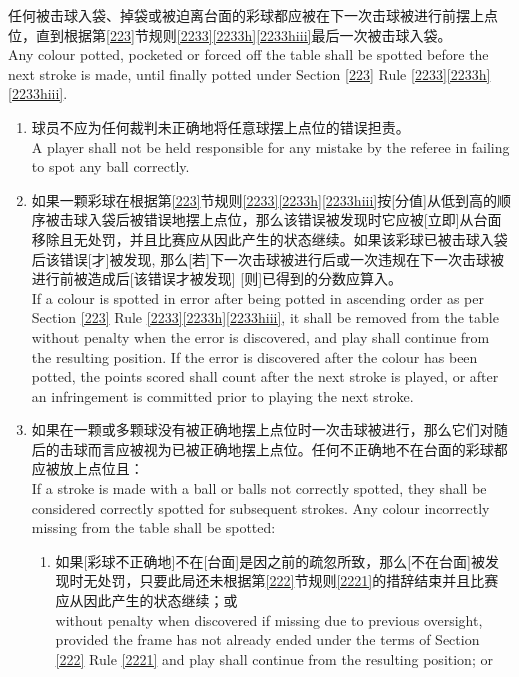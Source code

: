\noindent 任何被击球入袋、掉袋或被迫离台面的彩球都应被在下一次击球被进行前摆上点位，直到根据第\ref{223}节规则\ref{2233}\ref{2233h}\ref{2233hiii}最后一次被击球入袋。\\
Any colour potted, pocketed or forced off the table shall be spotted before the next stroke is made, until finally potted under Section \ref{223} Rule \ref{2233}\ref{2233h}\ref{2233hiii}.
\begin{enumerate}[label=(\alph*)]
    \item 球员不应为任何裁判未正确地将任意球摆上点位的错误担责。\\
    A player shall not be held responsible for any mistake by the referee in failing to spot any ball correctly.
    \item 如果一颗彩球在根据第\ref{223}节规则\ref{2233}\ref{2233h}\ref{2233hiii}按[分值]从低到高的顺序被击球入袋后被错误地摆上点位，那么该错误被发现时它应被[立即]从台面移除且无处罚，并且比赛应从因此产生的状态继续。如果该彩球已被击球入袋后该错误[才]被发现, 那么[若]下一次击球被进行后或一次违规在下一次击球被进行前被造成后[该错误才被发现] [则]已得到的分数应算入。\\
    If a colour is spotted in error after being potted in ascending order as per Section \ref{223} Rule \ref{2233}\ref{2233h}\ref{2233hiii}, it shall be removed from the table without penalty when the error is discovered, and play shall continue from the resulting position. If the error is discovered after the colour has been potted, the points scored shall count after the next stroke is played, or after an infringement is committed prior to playing the next stroke.
    \item \label{2237c}如果在一颗或多颗球没有被正确地摆上点位时一次击球被进行，那么它们对随后的击球而言应被视为已被正确地摆上点位。任何不正确地不在台面的彩球都应被放上点位且：\\
    If a stroke is made with a ball or balls not correctly spotted, they shall be considered correctly spotted for subsequent strokes. Any colour incorrectly missing from the table shall be spotted:
    \begin{enumerate}[label=(\roman*)]
        \item 如果[彩球不正确地]不在[台面]是因之前的疏忽所致，那么[不在台面]被发现时无处罚，只要此局还未根据第\ref{222}节规则\ref{2221}的措辞结束并且比赛应从因此产生的状态继续；或\\
        without penalty when discovered if missing due to previous oversight, provided the frame has not already ended under the terms of Section \ref{222} Rule \ref{2221} and play shall continue from the resulting position; or

\end{enumerate}
\end{enumerate}
